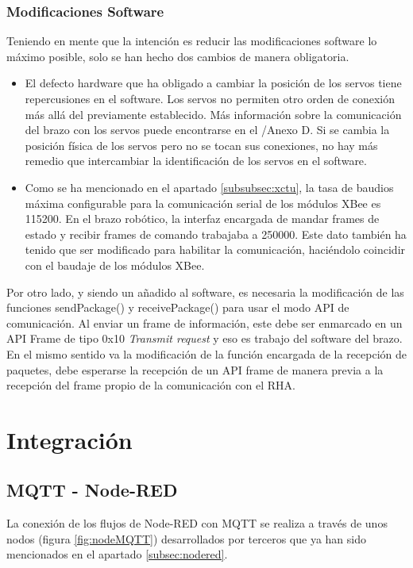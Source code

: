 \subsubsection{Modificaciones Software}

Teniendo en mente que la intención es reducir las modificaciones software lo máximo posible, solo se han hecho dos cambios de manera obligatoria.
\begin{itemize}
\item El defecto hardware que ha obligado a cambiar la posición de los servos tiene repercusiones en el software. Los servos no permiten otro orden de conexión más allá del previamente establecido. Más información sobre la comunicación del brazo con los servos puede encontrarse en el \cite{Heredia1:2018}/Anexo D. Si se cambia la posición física de los servos pero no se tocan sus conexiones, no hay más remedio que intercambiar la identificación de los servos en el software.

\item Como se ha mencionado en el apartado \ref{subsubsec:xctu}, la tasa de baudios máxima configurable para la comunicación serial de los módulos XBee es 115200. En el brazo robótico, la interfaz encargada de mandar frames de estado y recibir frames de comando trabajaba a 250000. Este dato también ha tenido que ser modificado para habilitar la comunicación, haciéndolo coincidir con el baudaje de los módulos XBee.
\end{itemize}

Por otro lado, y siendo un añadido al software, es necesaria la modificación de las funciones sendPackage() y receivePackage() para usar el modo API de comunicación. Al enviar un frame de información, este debe ser enmarcado en un API Frame de tipo 0x10 \textit{Transmit request} y eso es trabajo del software del brazo. En el mismo sentido va la modificación de la función encargada de la recepción de paquetes, debe esperarse la recepción de un API frame de manera previa a la recepción del frame propio de la comunicación con el RHA.

\section{Integración}

\subsection{MQTT - Node-RED}

La conexión de los flujos de Node-RED con MQTT se realiza a través de unos nodos (figura \ref{fig:nodeMQTT}) desarrollados por terceros que ya han sido mencionados en el apartado \ref{subsec:nodered}.

